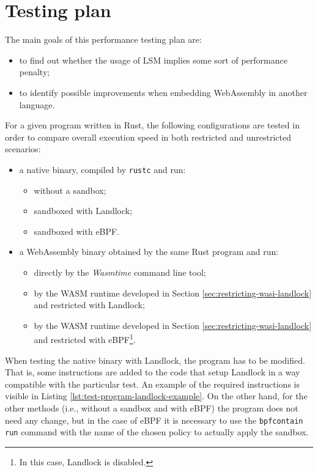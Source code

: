 \section{Testing plan}

The main goals of this performance testing plan are:
\begin{itemize}
  \item to find out whether the usage of LSM implies some sort of performance penalty;
  \item to identify possible improvements when embedding WebAssembly in another language.
\end{itemize}

\noindent
For a given program written in Rust, the following configurations are tested in order to compare
overall execution speed in both restricted and unrestricted scenarios:
\begin{itemize}
  \item a native binary, compiled by \texttt{rustc} and run:
        \begin{itemize}
          \item without a sandbox;
          \item sandboxed with Landlock;
          \item sandboxed with eBPF.
        \end{itemize}
  \item a WebAssembly binary obtained by the same Rust program and run:
        \begin{itemize}
          \item directly by the \textit{Wasmtime} command line tool;
          \item by the WASM runtime developed in Section \ref{sec:restricting-wasi-landlock} and restricted with Landlock;
          \item by the WASM runtime developed in Section \ref{sec:restricting-wasi-landlock} and restricted with
                eBPF\footnote{In this case, Landlock is disabled.}.
        \end{itemize}
\end{itemize}

When testing the native binary with Landlock, the program has to be modified. That is,
some instructions are added to the code that setup Landlock in a way compatible with the
particular test. An example of the required instructions is visible in Listing \ref{lst:test-program-landlock-example}.
On the other hand, for the other methods (i.e., without a sandbox and with eBPF) the program
does not need any change, but in the case of eBPF it is necessary to use the \texttt{bpfcontain run}
command with the name of the chosen policy to actually apply the sandbox.

